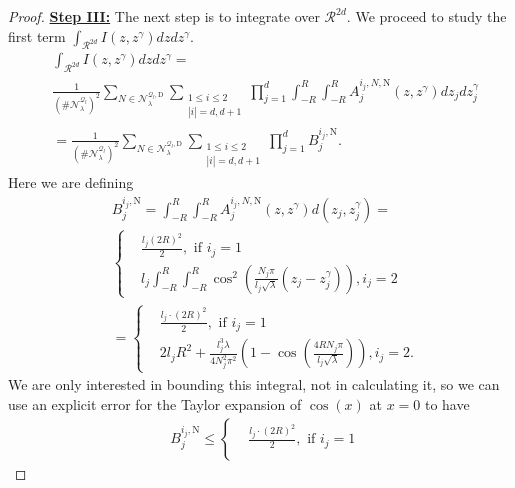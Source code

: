 \documentclass{amsart}
\theoremstyle{definition}
\theoremstyle{remark}
\renewcommand\leq\leqslant
\numberwithin{equation}{section}
\theoremstyle{definition}
\theoremstyle{remark}
\begin{document}
\begin{proof}
\textbf{	\underline{Step III:}}
	The next step is to integrate over $\mathcal{R}^{2d}$. We proceed to study the first term  $\int_{\mathcal{R}^{2d}}I(z,z^\gamma)dzdz^\gamma$.
	\begin{equation}
		\begin{aligned}
			&\int_{\mathcal{R}^{2d}}I(z,z^\gamma)dzdz^\gamma=\\&\frac{1}{\left(\#\mathcal{N}_\lambda^{\mathcal{Q}_l}\right)^2}\sum_{N\in\mathcal{N}_\lambda^{\mathcal{Q}_l,\mathrm{D}}}\sum_{\substack{1\leq i\leq 2\\|i|=d,d+1}} \prod_{j=1}^d \int_{-R}^R\int_{-R}^RA_j^{i_j,N,\mathrm{N}}(z,z^\gamma)dz_jdz^\gamma_j\\&=\frac{1}{\left(\#\mathcal{N}_\lambda^{\mathcal{Q}_l}\right)^2}\sum_{N\in\mathcal{N}_\lambda^{\mathcal{Q}_l,\mathrm{D}}}\sum_{\substack{1\leq i\leq 2\\|i|=d,d+1}} \prod_{j=1}^d B_j^{i_j,\mathrm{N}}.
		\end{aligned}
	\end{equation}
	Here we are defining \begin{equation}
		\begin{aligned}
			&B_j^{i_j,\mathrm{N}}=\int_{-R}^R\int_{-R}^RA_j^{i_j,N,\mathrm{N}}(z,z^\gamma)d(z_j,z^\gamma_j)=\\&\left\{\begin{aligned}
				&\frac{l_j (2R)^2}{2},\text{ if }i_j=1\\
				&l_j\int_{-R}^R\int_{-R}^R\cos^2\left(\frac{N_j\pi}{l_j\sqrt{\lambda}}(z_j-z^\gamma_j)\right),i_j=2
			\end{aligned}\right.\\&=\left\{\begin{aligned}
				&\frac{l_j \cdot (2R)^2}{2},\text{ if }i_j=1\\
				&2l_j R^2+\frac{l_j^3\lambda}{4N_j^2\pi^2}\left(1-\cos\left(\frac{4RN_j\pi}{l_j\sqrt{\lambda}}\right)\right),i_j=2.
			\end{aligned}\right.
		\end{aligned}
	\end{equation}
	We are only interested in bounding this integral, not in calculating it, so we can use an explicit error for the Taylor expansion of $\cos(x)$ at $x=0$ to have 
	\begin{equation}
		\begin{aligned}
			&B_j^{i_j,\mathrm{N}}\leq\left\{\begin{aligned}
				&\frac{l_j \cdot (2R)^2}{2},\text{ if }i_j=1\\

\end{aligned}
\end{aligned}
\end{equation}
\end{proof}
\end{document}
